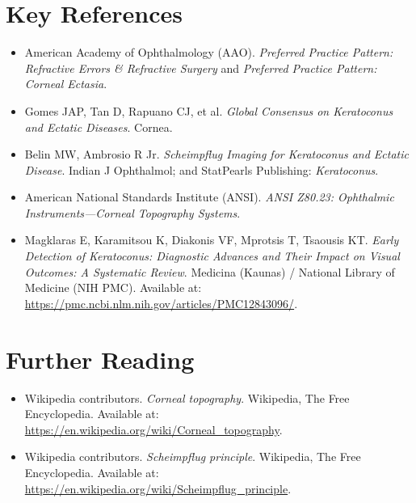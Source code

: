 \section{Key References}
\begin{itemize}
    \item American Academy of Ophthalmology (AAO). \textit{Preferred Practice Pattern: Refractive Errors \& Refractive Surgery} and \textit{Preferred Practice Pattern: Corneal Ectasia}.
    \item Gomes JAP, Tan D, Rapuano CJ, et al. \textit{Global Consensus on Keratoconus and Ectatic Diseases}. Cornea.
    \item Belin MW, Ambrosio R Jr. \textit{Scheimpflug Imaging for Keratoconus and Ectatic Disease}. Indian J Ophthalmol; and StatPearls Publishing: \textit{Keratoconus}.
    \item American National Standards Institute (ANSI). \textit{ANSI Z80.23: Ophthalmic Instruments---Corneal Topography Systems}.
    \item Magklaras E, Karamitsou K, Diakonis VF, Mprotsis T, Tsaousis KT. \textit{Early Detection of Keratoconus: Diagnostic Advances and Their Impact on Visual Outcomes: A Systematic Review}. Medicina (Kaunas) / National Library of Medicine (NIH PMC). Available at: \url{https://pmc.ncbi.nlm.nih.gov/articles/PMC12843096/}.
\end{itemize}

\section{Further Reading}
\begin{itemize}
  \item Wikipedia contributors. \textit{Corneal topography}. Wikipedia, The Free Encyclopedia. Available at: \url{https://en.wikipedia.org/wiki/Corneal_topography}.
  \item Wikipedia contributors. \textit{Scheimpflug principle}. Wikipedia, The Free Encyclopedia. Available at: \url{https://en.wikipedia.org/wiki/Scheimpflug_principle}.
\end{itemize}
